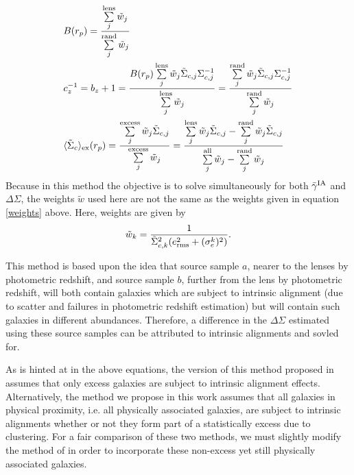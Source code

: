 \documentclass[a4paper,fleqn,usenatbib]{mnras}
\begin{document}
\begin{align}
&B(r_p) = \frac{\sum\limits_{j}^{\rm lens}\tilde{w}_j}{\sum\limits_{j}^{\rm rand} \tilde{w}_j} \label{boost} \\
&c_z^{-1} = b_z+1 = \frac{B(r_p) \sum\limits^{\rm lens}_{j} \tilde{w}_j \tilde{\Sigma}_{c,j} \Sigma_{c,j}^{-1}}{\sum\limits^{\rm lens}_{j} \tilde{w}_j} = \frac{\sum\limits^{\rm rand}_{j} \tilde{w}_j \tilde{\Sigma}_{c,j} \Sigma_{c,j}^{-1}}{\sum\limits^{\rm rand}_{j} \tilde{w}_j} \label{photozbias} \\
&\langle \tilde{\Sigma}_c\rangle_{\rm ex} (r_p) =  \frac{\sum\limits_{j}^{\rm excess} \tilde{w}_j \tilde{\Sigma}_{c,j}}{\sum\limits_{j}^{\rm excess} \tilde{w}_j} = \frac{\sum\limits_{j}^{\rm lens} \tilde{w}_j \tilde{\Sigma}_{c,j}- \sum\limits_{j}^{\rm rand} \tilde{w}_j \tilde{\Sigma}_{c,j}}{\sum\limits_{j}^{\rm all} \tilde{w}_j - \sum\limits_{j}^{\rm rand} \tilde{w}_j}\label{Sigmaex}
\end{align}
Because in this method the objective is to solve simultaneously for both $\bar{\gamma}^{\rm IA}$ and $\Delta \Sigma$, the weights $\tilde{w}$ used here are not the same as the weights given in equation \ref{weights} above. Here, weights are given by
\begin{equation}
\tilde{w}_k = \frac{1}{\tilde{\Sigma}_{c,k}^2 (e_{\rm rms}^2 + (\sigma_e^k)^2)}.
\label{weights_Blazek}
\end{equation}

This method is based upon the idea that source sample $a$, nearer to the lenses by photometric redshift, and source sample $b$, further from the lens by photometric redshift, will both contain galaxies which are subject to intrinsic alignment (due to scatter and failures in photometric redshift estimation) but will contain such galaxies in different abundances. Therefore, a difference in the $\Delta \Sigma$ estimated using these source samples can be attributed to intrinsic alignments and sovled for.

As is hinted at in the above equations, the version of this method proposed in \cite{Blazek2012} assumes that only excess galaxies are subject to intrinsic alignment effects. Alternatively, the method we propose in this work assumes that all galaxies in physical proximity, i.e. all physically associated galaxies, are subject to intrinsic alignments whether or not they form part of a statistically excess due to clustering. For a fair comparison of these two methods, we must slightly modify the method of \cite{Blazek2012} in order to incorporate these non-excess yet still physically associated galaxies.
\end{document}
